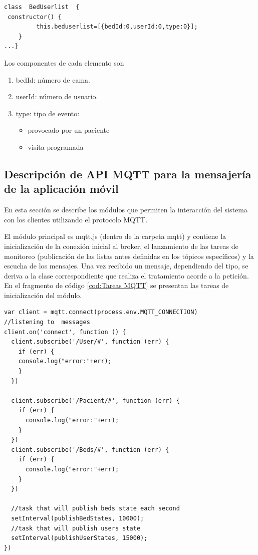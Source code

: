 \begin{itemize}
\begin{lstlisting}[label=cod:BedUserlist,caption=  Clase BedsUserList]
class  BedUserlist  { 
 constructor() {
         this.beduserlist=[{bedId:0,userId:0,type:0}];                        
    }
...}
\end{lstlisting}

Los componentes de cada elemento son 
	\begin{enumerate}
		\item bedId: número de cama.
		\item userId: número de usuario.
		\item type: tipo de evento: 
		\begin{itemize}
			\item provocado por un paciente
			\item visita programada		
		\end{itemize}		 	

	\end{enumerate}


\end{itemize}
\subsection{Descripción de API MQTT para la mensajería de la aplicación móvil}

En esta sección se describe los módulos que permiten la interacción del sistema con los clientes utilizando el protocolo MQTT.


El módulo principal es mqtt.js (dentro de la carpeta mqtt) y contiene la inicialización de la conexión inicial al broker, el lanzamiento de las tareas de monitoreo (publicación de las listas antes definidas en los tópicos específicos) y la escucha de los mensajes. Una vez recibido un mensaje, dependiendo del tipo, se deriva a la clase correspondiente que realiza el tratamiento acorde a la petición. En el fragmento de código  \ref{cod:Tareas MQTT} se presentan las tareas de inicialización del módulo.



\begin{lstlisting}[label=cod:Tareas MQTT,caption=  Tareas ejecutadas por mqtt.js]
var client = mqtt.connect(process.env.MQTT_CONNECTION)
//listening to  messages
client.on('connect', function () {
  client.subscribe('/User/#', function (err) {
    if (err) {
    console.log("error:"+err);
    }
  })

  client.subscribe('/Pacient/#', function (err) {
    if (err) {      
      console.log("error:"+err);
    }
  })
  client.subscribe('/Beds/#', function (err) {
    if (err) {      
      console.log("error:"+err);
    }
  })

  //task that will publish beds state each second
  setInterval(publishBedStates, 10000);
  //task that will publish users state 
  setInterval(publishUserStates, 15000);
})
\end{lstlisting}

